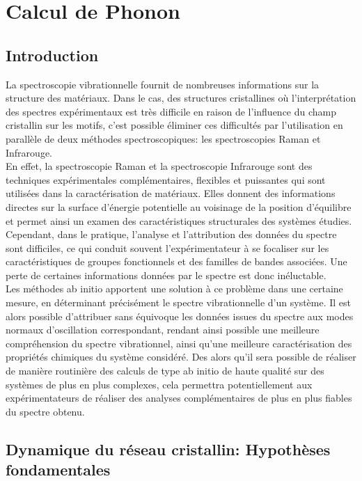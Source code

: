 \chapter[Calcul de Phonon]{Calcul de Phonon}
\minitoc
\restoregeometry

\newpage
	\section*{Introduction}
	La spectroscopie vibrationnelle fournit de nombreuses informations sur la structure des matériaux. Dans le cas, des structures cristallines où l'interprétation des spectres expérimentaux est très difficile en raison de l'influence du champ cristallin sur les motifs, c'est possible éliminer ces difficultés par l'utilisation en parallèle de deux méthodes spectroscopiques: les spectroscopies Raman et Infrarouge. \\
	
	En effet, la spectroscopie Raman et la spectroscopie Infrarouge sont des techniques expérimentales complémentaires, flexibles et puissantes qui sont utilisées dans la caractérisation de matériaux. Elles donnent des informations directes sur la surface d'énergie potentielle au voisinage de la position d'équilibre et permet ainsi un examen des caractéristiques structurales des systèmes étudies. Cependant, dans le pratique, l'analyse et l'attribution des données du spectre sont difficiles, ce qui conduit souvent l'expérimentateur à se focaliser sur les caractéristiques de groupes fonctionnels et des familles de bandes associées. Une perte de certaines informations données par le spectre est donc inéluctable. \\
		
	Les méthodes ab initio apportent une solution à ce problème dans une certaine mesure, en déterminant précisément le spectre vibrationnelle d'un système. Il est alors possible d'attribuer sans équivoque les données issues du spectre aux modes normaux d'oscillation correspondant, rendant ainsi possible une meilleure compréhension du spectre vibrationnel, ainsi qu'une meilleure caractérisation des propriétés chimiques du système considéré. Des alors qu'il sera possible de réaliser de manière routinière des calculs de type ab initio de haute qualité sur des systèmes de plus en plus complexes, cela permettra potentiellement aux expérimentateurs de réaliser des analyses complémentaires de plus en plus fiables du spectre obtenu. 
	
		
\section{Dynamique du réseau cristallin: Hypothèses fondamentales}
	
